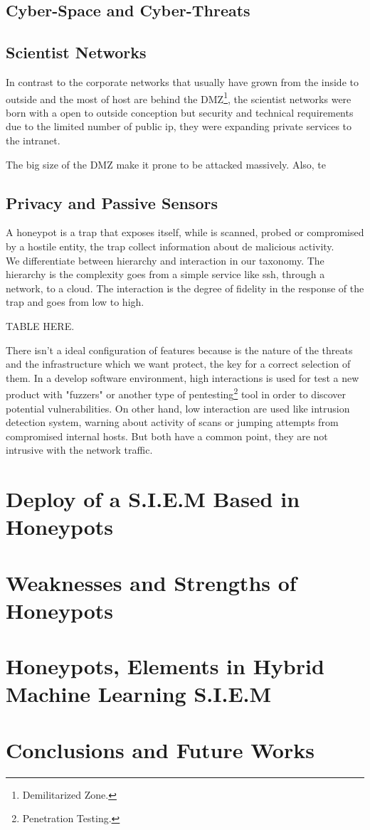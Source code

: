 \documentclass[a4paper]{llncs}
\begin{document}
\subsection{Cyber-Space and Cyber-Threats}
\label{sect:Scientist Networks}

\subsection{Scientist Networks}
\label{sect:Scientist Networks}
In contrast to the corporate networks that usually have grown from the inside to outside and the most of host are behind the DMZ\footnote{Demilitarized Zone.}, the scientist networks were born with a open to outside conception but security and technical requirements due to the limited number of public ip, they were expanding private services to the intranet.

The big size of the DMZ make it prone to be attacked massively. Also, te 

\subsection{Privacy and Passive Sensors}
\label{sect:Privacy and Passive Sensors}
A honeypot is a trap that exposes itself, while is scanned, probed or compromised by a hostile entity, the trap collect information about de malicious activity.
\\We differentiate between hierarchy and interaction in our taxonomy. The hierarchy is the complexity goes from a simple service like ssh, through a network, to a cloud. The interaction is the degree of fidelity in the response of the trap and goes from low to high. 

TABLE HERE.

There isn't a ideal configuration of features because is the nature of the threats and the infrastructure which we want protect, the key for a correct selection of them. In a develop software environment, high interactions is used for test a new product with "fuzzers" or another type of pentesting\footnote{Penetration Testing.} tool in order to discover potential vulnerabilities. On other hand, low interaction are used like intrusion detection system, warning about activity of scans or jumping attempts from compromised internal hosts. But both have a common point, they are not intrusive with the network traffic.

\section{Deploy of a S.I.E.M Based in Honeypots}

\section{Weaknesses and Strengths of Honeypots}

\section{Honeypots, Elements in Hybrid Machine Learning S.I.E.M}

\section{Conclusions and Future Works}
\end{document}
